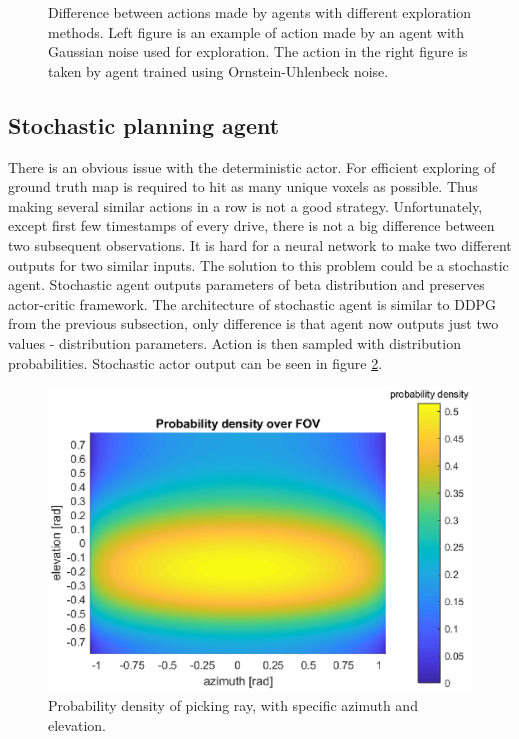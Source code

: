 \begin{figure}[H]
\begin{subfigure}[h]{0.5\linewidth}
\end{subfigure}
\captionsetup{width=1\textwidth}
\caption[Difference between exploration methods]{Difference between actions made by agents with different exploration methods. Left figure is an example of action made by an agent with Gaussian noise used for exploration. The action in the right figure is taken by agent trained using Ornstein-Uhlenbeck noise.}
\label{fig:expdiff}
\end{figure}

\subsection{Stochastic planning agent}
There is an obvious issue with the deterministic actor. For efficient exploring of ground truth map is required to hit as many unique voxels as possible. Thus making several similar actions in a row is not a good strategy. Unfortunately, except first few timestamps of every drive, there is not a big difference between two subsequent observations. It is hard for a neural network to make two different outputs for two similar inputs. The solution to this problem could be a stochastic agent. Stochastic agent outputs parameters of beta distribution and preserves actor-critic framework. The architecture of stochastic agent is similar to DDPG from the previous subsection, only difference is that agent now outputs just two values - distribution parameters. Action is then sampled with distribution probabilities. Stochastic actor output can be seen in figure \ref{fig:stochaction}.

\clearpage

\begin{figure}[H]
\centering
\includegraphics[width=0.9\linewidth]{fig/betapdf.eps}
\caption[Example of stochastic actor output]{Probability density of picking ray, with specific azimuth and elevation.}
\label{fig:stochaction}
\end{figure}

